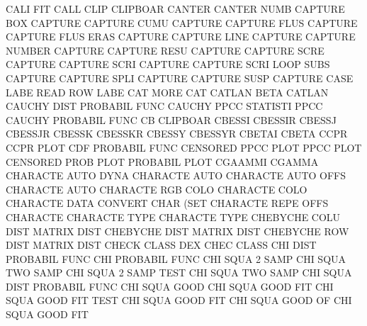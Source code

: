 CALI                                    FIT
CALL     CLIP                           CLIPBOAR
CANTER                                  CANTER   NUMB
CAPTURE  BOX                            CAPTURE
CAPTURE  CUMU                           CAPTURE
CAPTURE  FLUS                           CAPTURE
CAPTURE  FLUS ERAS                      CAPTURE
CAPTURE  LINE                           CAPTURE
CAPTURE  NUMBER                         CAPTURE
CAPTURE  RESU                           CAPTURE
CAPTURE  SCRE                           CAPTURE
CAPTURE  SCRI                           CAPTURE
CAPTURE  SCRI LOOP SUBS                 CAPTURE
CAPTURE  SPLI                           CAPTURE
CAPTURE  SUSP                           CAPTURE
CASE     LABE                           READ     ROW  LABE
CAT      MORE                           CAT
CATLAN   BETA                           CATLAN
CAUCHY   DIST                           PROBABIL FUNC
CAUCHY   PPCC                           STATISTI PPCC
CAUCHY                                  PROBABIL FUNC
CB                                      CLIPBOAR
CBESSI                                  CBESSIR
CBESSJ                                  CBESSJR
CBESSK                                  CBESSKR
CBESSY                                  CBESSYR
CBETAI                                  CBETA
CCPR                                    CCPR     PLOT
CDF                                     PROBABIL FUNC
CENSORED PPCC PLOT                      PPCC     PLOT
CENSORED PROB PLOT                      PROBABIL PLOT
CGAAMMI                                 CGAMMA
CHARACTE AUTO DYNA                      CHARACTE AUTO
CHARACTE AUTO OFFS                      CHARACTE AUTO
CHARACTE RGB  COLO                      CHARACTE COLO
CHARACTE DATA                           CONVERT  CHAR (SET
CHARACTE REPE OFFS                      CHARACTE
CHARACTE TYPE                           CHARACTE TYPE
CHEBYCHE COLU DIST                      MATRIX   DIST
CHEBYCHE DIST                           MATRIX   DIST
CHEBYCHE ROW  DIST                      MATRIX   DIST
CHECK    CLASS                          DEX      CHEC CLASS
CHI      DIST                           PROBABIL FUNC
CHI                                     PROBABIL FUNC
CHI      SQUA 2    SAMP                 CHI      SQUA TWO  SAMP
CHI      SQUA 2    SAMP TEST            CHI      SQUA TWO  SAMP
CHI      SQUA DIST                      PROBABIL FUNC
CHI      SQUA GOOD                      CHI      SQUA GOOD FIT
CHI      SQUA GOOD FIT  TEST            CHI      SQUA GOOD FIT
CHI      SQUA GOOD OF                   CHI      SQUA GOOD FIT
